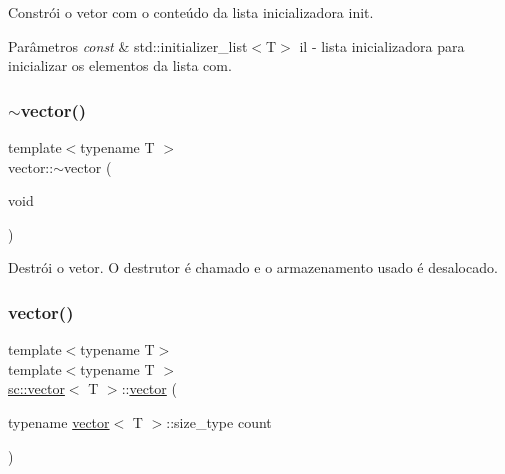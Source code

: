 Constrói o vetor com o conteúdo da lista inicializadora init. 
\begin{DoxyParams}{Parâmetros}
{\em const} & std\+::initializer\+\_\+list$<$\+T$>$ il -\/ lista inicializadora para inicializar os elementos da lista com. \\
\hline
\end{DoxyParams}
\mbox{\label{classsc_1_1vector_a2360fd6b0e63319e12d30ebc4c8330ab}} 
\subsubsection{\texorpdfstring{$\sim$vector()}{~vector()}}
{\footnotesize\ttfamily template$<$typename T $>$ \\
vector\+::$\sim$vector (\begin{DoxyParamCaption}\item[{void}]{ }\end{DoxyParamCaption})\hspace{0.3cm}{\ttfamily [default]}}

Destrói o vetor. O destrutor é chamado e o armazenamento usado é desalocado. \mbox{\label{classsc_1_1vector_a09edcd127164af330873721038aa4ccc}} 
\subsubsection{\texorpdfstring{vector()}{vector()}\hspace{0.1cm}{\footnotesize\ttfamily [6/11]}}
{\footnotesize\ttfamily template$<$typename T$>$ \\
template$<$typename T $>$ \\
\mbox{\hyperlink{classsc_1_1vector}{sc\+::vector}}$<$ T $>$\+::\mbox{\hyperlink{classsc_1_1vector}{vector}} (\begin{DoxyParamCaption}\item[{typename \mbox{\hyperlink{classsc_1_1vector}{vector}}$<$ T $>$\+::size\+\_\+type}]{count }\end{DoxyParamCaption})}

\mbox{\label{classsc_1_1vector_a64ed605fc5b5449da4c90177268ff101}} 

